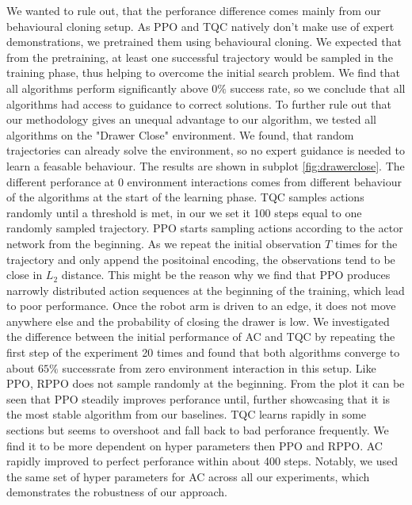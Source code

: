 We wanted to rule out, that the perforance difference comes mainly from our behavioural cloning setup. As PPO and TQC natively don't make use of expert demonstrations, 
we pretrained them using behavioural cloning. We expected that from the pretraining, at least one successful trajectory would be sampled in the training phase, thus 
helping to overcome the initial search problem. We find that all algorithms perform significantly above $0 \%$ success rate, so we conclude that all algorithms had 
access to guidance to correct solutions. To further rule out that our methodology gives an unequal advantage to our algorithm, we tested all algorithms on the 
"Drawer Close" environment. We found, that random trajectories can already solve the environment, so no expert guidance is needed to learn a feasable behaviour. 
The results are shown in subplot \ref{fig:drawerclose}. The different perforance at 0 environment interactions comes from different behaviour of the algorithms at 
the start of the learning phase. TQC samples actions randomly until a threshold is met, in our we set it 100 steps equal to one randomly sampled trajectory. 
PPO starts sampling actions according to the actor network from the beginning. As we repeat the initial observation $T$ times for the trajectory and only append the 
positoinal encoding, the observations tend to be close in $L_2$ distance. This might be the reason why we find that PPO produces narrowly distributed action sequences 
at the beginning of the training, which lead to poor performance. Once the robot arm is driven to an edge, it does not move anywhere else and the probability of 
closing the drawer is low. We investigated the difference between the initial performance of AC and TQC by repeating the first step of the experiment 20 times and 
found that both algorithms converge to about $65 \%$ successrate from zero environment interaction in this setup. Like PPO, RPPO does not sample randomly at the 
beginning. From the plot it can be seen that PPO steadily improves perforance until, further showcasing that it is the most stable algorithm from our baselines. 
TQC learns rapidly in some sections but seems to overshoot and fall back to bad perforance frequently. We find it to be more dependent on hyper parameters then PPO 
and RPPO. AC rapidly improved to perfect perforance within about 400 steps. Notably, we used the same set of hyper parameters for AC across all our experiments, 
which demonstrates the robustness of our approach. \\

